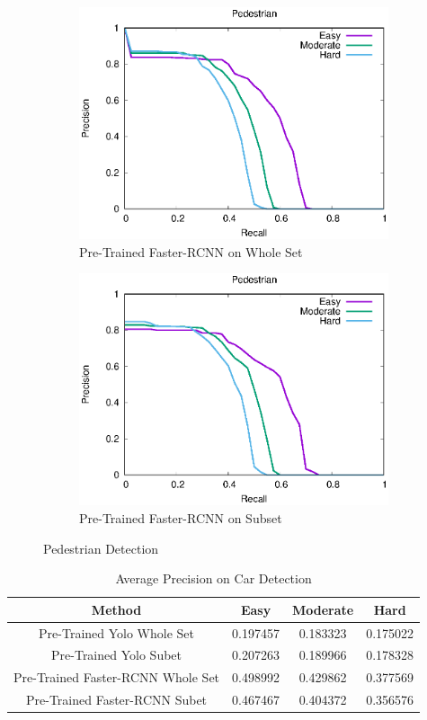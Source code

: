 \begin{figure}[H]
\begin{subfigure}[t]{.24\textwidth}
    \includegraphics[width=1.0\linewidth]{img/FRCNN_Nov_8/plot_valid/pedestrian_detection.eps}
    \caption{Pre-Trained Faster-RCNN on Whole Set}
\end{subfigure}
\begin{subfigure}[t]{.24\textwidth}
    \centering
    \includegraphics[width=1.0\linewidth]{img/FRCNN_Nov_8/plot_valid_30/pedestrian_detection.eps}
    \caption{Pre-Trained Faster-RCNN on Subset}
\end{subfigure}
\caption{Pedestrian Detection}
\end{figure}

\begin{table}[h!]
\centering
\begin{tabular}{ c | c | c | c }
\hline
Method & Easy & Moderate & Hard \\
\hline \hline
Pre-Trained Yolo Whole Set & 0.197457 & 0.183323 & 0.175022 \\
Pre-Trained Yolo Subet & 0.207263 & 0.189966 & 0.178328 \\
Pre-Trained Faster-RCNN Whole Set & 0.498992 & 0.429862 & 0.377569 \\
Pre-Trained Faster-RCNN Subet & 0.467467 & 0.404372 & 0.356576 \\
\hline
\end{tabular}
\caption{Average Precision on Car Detection}
\end{table}

